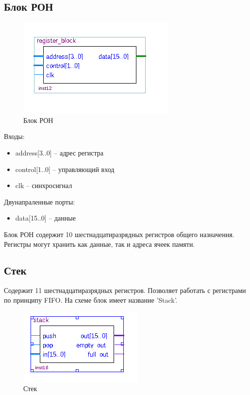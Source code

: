 \subsection{Блок РОН}
\begin{figure}[ht]{\textwidth}
\centering
    \includegraphics[scale=0.8]{regb}
    \caption{Блок РОН}
\end{figure}

Входы:
\begin{itemize}
    \item address[3..0] -- адрес регистра
    \item control[1..0] -- управляющий вход
    \item clk -- синхросигнал
\end{itemize}
Двунапраленные порты:
\begin{itemize}
    \item data[15..0] -- данные
\end{itemize}

Блок РОН содержит 10 шестнадцатиразрядных регистров общего назначения. Регистры могут хранить как данные, так и адреса ячеек памяти.

\subsection{Стек}
Содержит 11 шестнадцатиразрядных регистров. Позволяет работать с регистрами по принципу FIFO. На схеме блок имеет название 'Stack'.

\begin{figure}[ht]{\textwidth}
\centering
    \includegraphics[scale=0.8]{stackb}
    \caption{Стек}
\end{figure}

